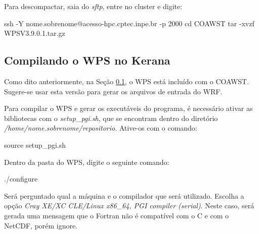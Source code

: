 \noindent Para descompactar, saia do \textit{sftp}, entre no cluster e digite:
\bigskip

\begin{bashcode}
ssh -Y nome.sobrenome@acesso-hpc.cptec.inpe.br -p 2000
cd COAWST
tar -xvzf WPSV3.9.0.1.tar.gz
\end{bashcode}
\bigskip

\subsection{Compilando o WPS no Kerana}\label{wpsker}
\bigskip

\begin{tcolorbox}[enhanced,
  grow to left by=0cm,%
  grow to right by=0cm,%
  enlarge top by=0cm,%
  enlarge bottom by=0cm,%
  tcbox raise base,
  boxrule=1.0pt,
  left=18mm,
  colframe=red!50!black,coltext=red!25!black,colback=red!10!white,
  overlay={\begin{tcbclipinterior}\fill[red!75!blue!50!white] (frame.south west)
    rectangle node[text=white,font=\sffamily\bfseries\footnotesize,rotate=0] {ATENÇÃO} ([xshift=18mm]frame.north west);\end{tcbclipinterior}}]
Como dito anteriormente, na Seção \textcolor{bleu_cite}{\ref{wpsker}}, o WPS está incluído com o COAWST. Sugere-se usar esta versão para gerar os arquivos de entrada do WRF.
\end{tcolorbox}
\bigskip

\noindent Para compilar o WPS e gerar os executáveis do programa, é necessário ativar as bibliotecas com o \textit{setup\_pgi.sh}, 
          que se encontram dentro do diretório \textit{/home/nome.sobrenome/repositorio}. Ative-os com o comando:
\bigskip

\begin{bashcode}
source setup_pgi.sh
\end{bashcode}
\bigskip

\noindent Dentro da pasta do WPS, digite o seguinte comando:
\bigskip

\begin{bashcode}
./configure
\end{bashcode}
\bigskip

\noindent Será perguntado qual a máquina e o compilador que será utilizado. Escolha a opção \textit{Cray XE/XC CLE/Linux x86\_64, PGI compiler (serial)}. Neste caso, será gerada uma mensagem que o Fortran não é compatível com o C e com o NetCDF, porém ignore.
\bigskip

